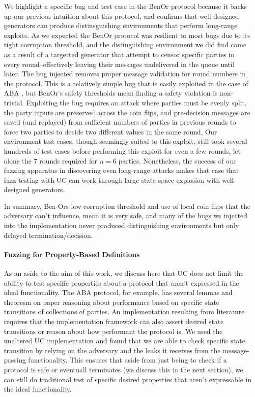 We highlight a specific bug and test case in the BenOr protocol because it
backs up our previous intuition about this protocol, and confirms that well
designed generators can produce distinsguishing environments that perform
long-range exploits.  As we expected the BenOr protocol was resilient to most
bugs due to its tight corruption threshold, and the distinguishing environment
we did find came as a result of a targetted generator that attempt to censor
specific parties in every round--effectively leaving their messages undelivered
in the queue until later.  The bug injected removes proper message validation
for round numbers in the protocol. This is a relatively simple bug that is
easily exploited in the case of ABA , but BenOr's safety
thresholds mean finding a safety violation is non-trivial.  Exploiting the bug
requires an attack where parties must be evenly split, the party inputs are
preserved across the coin flips, and pre-decision messages are saved (and
replayed) from sufficient numbers of parties in previous rounds to force two
parties to decide two different values in the same round, Our environment test
cases, though seemingly suited to this exploit, still took several hundreds of
test cases before performing this exploit for even a few rounds, let alone the
7 rounds required for $n=6$ parties.  Nonetheless, the success of our fuzzing
apparatus in discovering even long-range attacks makes that case that fuzz
testing with UC can work through large state space explosion with well designed
generators. 

In summary, Ben-Ors low corruption threshold and use of local coin flips that
the adversary can't influence, mean it is very safe, and many of the bugs we
injected into the implementation never produced distinguishing environments but
only delayed termination/decision.


\paragraph{Fuzzing for Property-Based Definitions}
As an aside to the aim of this work, we discuss here that UC does not limit the
ability to test specific properties about a protocol that aren't expressed in
the ideal functionality.  The ABA protocol, for example, has several lemmas and
theoresm on paper reasoning about performance based on specific state
transitions of collections of parties.  An implementation resulting from
literature requires that the implementation framework can also assert desired
state transitions or reason about how performant the protocol is.  We used the
unaltered UC implementation and found that we are able to check specific state
transition by relying on the adversary and the leaks it receives from the
message-passing functionality.  This ensures that aside from just being to
check if a protocol is safe or eventuall terminates (we discuss this in the
next section), we can still do traditional test of specific desired properties
that aren't expressable in the ideal functionality.

